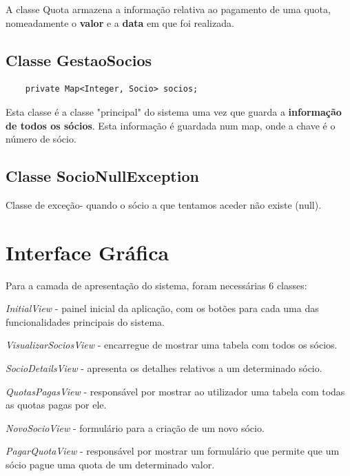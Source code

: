 \documentclass[a4paper]{article}
\begin{document}
\vspace{0.2cm}

A classe Quota armazena a informação relativa ao pagamento de uma quota, nomeadamente o \textbf{valor} e a \textbf{data} em que foi realizada.

\subsection{Classe GestaoSocios}
\label{sec:classegestaosocios}

\begin{verbatim}
    private Map<Integer, Socio> socios;
\end{verbatim}

\vspace{0.2cm}

Esta classe é a classe "principal" do sistema uma vez que guarda a \textbf{informação de todos os sócios}. Esta informação é guardada num map, onde a chave é o número de sócio.

\subsection{Classe SocioNullException}
\label{sec:classesocionull}

Classe de exceção- quando o sócio a que tentamos aceder não existe (null).


\section{Interface Gráfica}
\label{sec:view}

Para a camada de apresentação do sistema, foram necessárias 6 classes:

\begin{itemize}
\begin{item} \textit{InitialView} -  painel inicial da aplicação, com os botões para cada uma das funcionalidades principais do sistema.\end{item}
\begin{item} \textit{VisualizarSociosView} - encarregue de mostrar uma tabela com todos os sócios.\end{item}
\begin{item} \textit{SocioDetailsView} - apresenta os detalhes relativos a um determinado sócio.\end{item}
\begin{item} \textit{QuotasPagasView} - responsável por mostrar ao utilizador uma tabela com todas as quotas pagas por ele.\end{item}
\begin{item} \textit{NovoSocioView} - formulário para a criação de um novo sócio.\end{item}
\begin{item} \textit{PagarQuotaView} - responsável por mostrar um formulário que permite que um sócio pague uma quota de um determinado valor.\end{item}
\end{itemize}
\end{document}
